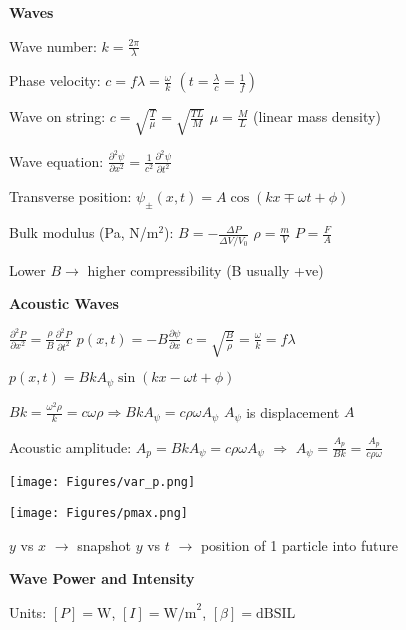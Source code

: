 \documentclass[twocolumn]{article}
\begin{document}
\small

\textbf{Waves}

Wave number: $k = \frac{2\pi}{\lambda}$

Phase velocity: $c = f\lambda = \frac{\omega}{k}$ \hspace{5em} $\left( t = \frac{\lambda}{c} = \frac{1}{f} \right)$

Wave on string: $c = \sqrt{\frac{T}{\mu}} = \sqrt{\frac{TL}{M}}$ \hfill $\mu = \frac{M}{L}$ (linear mass density)

Wave equation: $\frac{\partial^2 \psi}{\partial x^2} = \frac{1}{c^2} \frac{\partial^2 \psi}{\partial t^2}$

Transverse position: $\psi_\pm(x, t) = A \cos(kx \mp \omega t + \phi)$

Bulk modulus (Pa, N/m$^2$): $B = -\frac{\Delta P}{\Delta V/V_0}$ \hfill $\rho = \frac{m}{V}$ \hfill $P = \frac{F}{A}$

Lower $B \to$ higher compressibility (B usually +ve)

\vspace{-.5em}

\dotfill

\textbf{Acoustic Waves}

$\frac{\partial^2 P}{\partial x^2} = \frac{\rho}{B} \frac{\partial^2 P}{\partial t^2}$ \hfill $p(x, t) = -B \frac{\partial \psi}{\partial x}$ \hfill $c = \sqrt{\frac{B}{\rho}}  = \frac{\omega}{k} = f \lambda$

$p(x, t) = B k A_\psi \sin(kx-\omega t + \phi)$

$Bk = \frac{\omega^2 \rho}{k} = c \omega \rho \Rightarrow Bk A_\psi = c \rho \omega A_\psi$ \hfill $A_\psi$ is displacement $A$

Acoustic amplitude: $A_p = B k A_\psi = c \rho \omega A_\psi$ \hfill $\Rightarrow$ \hfill $A_\psi = \frac{A_p}{Bk} = \frac{A_p}{c \rho \omega}$

\centering \texttt{[image: Figures/var\_p.png]}

\texttt{[image: Figures/pmax.png]} \flushleft \vspace{-1em}

$y$ vs $x$ $\to$ snapshot \hfill $y$ vs $t$ $\to$ position of 1 particle into future

\vspace{-.5em}

\dotfill

\textbf{Wave Power and Intensity}

Units: $[P] = \text{W}$, $[I] = \text{W/m}^2$, $[\beta] = \text{dBSIL}$
\end{document}
